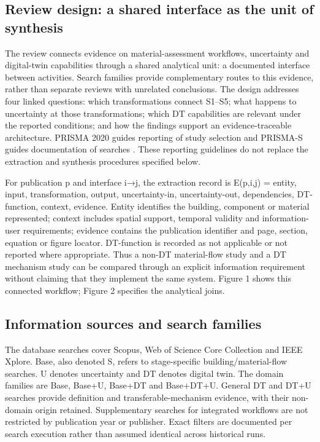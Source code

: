 \subsection{Review design: a shared interface as the unit of synthesis}
The review connects evidence on material-assessment workflows, uncertainty and digital-twin capabilities through a shared analytical unit: a documented interface between activities. Search families provide complementary routes to this evidence, rather than separate reviews with unrelated conclusions. The design addresses four linked questions: which transformations connect S1–S5; what happens to uncertainty at those transformations; which DT capabilities are relevant under the reported conditions; and how the findings support an evidence-traceable architecture. PRISMA 2020 guides reporting of study selection and PRISMA-S guides documentation of searches \citep{M01,M02}. These reporting guidelines do not replace the extraction and synthesis procedures specified below.

For publication p and interface i→j, the extraction record is E(p,i,j) = {entity, input, transformation, output, uncertainty-in, uncertainty-out, dependencies, DT-function, context, evidence}. Entity identifies the building, component or material represented; context includes spatial support, temporal validity and information-user requirements; evidence contains the publication identifier and page, section, equation or figure locator. DT-function is recorded as not applicable or not reported where appropriate. Thus a non-DT material-flow study and a DT mechanism study can be compared through an explicit information requirement without claiming that they implement the same system. Figure 1 shows this connected workflow; Figure 2 specifies the analytical joins.

\subsection{Information sources and search families}
The database searches cover Scopus, Web of Science Core Collection and IEEE Xplore. Base, also denoted S, refers to stage-specific building/material-flow searches. U denotes uncertainty and DT denotes digital twin. The domain families are Base, Base+U, Base+DT and Base+DT+U. General DT and DT+U searches provide definition and transferable-mechanism evidence, with their non-domain origin retained. Supplementary searches for integrated workflows are not restricted by publication year or publisher. Exact filters are documented per search execution rather than assumed identical across historical runs.

